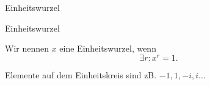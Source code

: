 \documentclass[class=article, crop=false]{standalone}
\begin{document}
\begin{zettel}{Einheitswurzel}
\begin{flashcard}[m6cwuk00]{Einheitswurzel}
	\begin{definition}[Einheitswurzel]
		Wir nennen $x$ eine Einheitswurzel, wenn
		\[
			\exists r : x^r = 1
		.\]
	\end{definition}
	\begin{example}[Einheitswurzeln]
		Elemente auf dem Einheitskreis sind zB. $-1,1,-i,i \dots$
	\end{example}

\end{flashcard}
\end{zettel}
\end{document}
